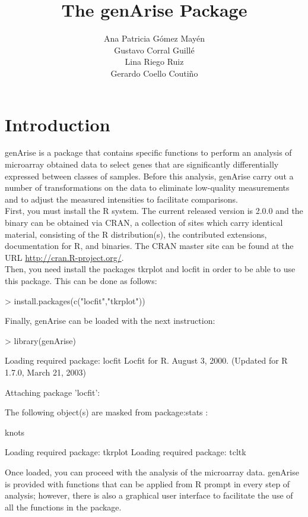 \documentclass[12pt]{article}
\title{The genArise Package}
\author{Ana Patricia G\'omez May\'en\\ Gustavo Corral Guill\'e\\ Lina Riego Ruiz\\ Gerardo Coello Couti\~no}
\begin{document}
\maketitle

\section{Introduction}

genArise is a package that contains specific functions to perform an analysis of microarray obtained data to select genes that are significantly differentially expressed between classes of samples. Before this analysis, genArise carry out a number of transformations on the data to eliminate low-quality measurements and to adjust the measured intensities to facilitate comparisons.\\

First, you must install the R system. The current released version is 2.0.0 and the binary can be obtained via CRAN, a collection of sites which carry identical material, consisting of the R distribution(s), the contributed extensions, documentation for R, and binaries. The CRAN master site can be found at the URL \url{http://cran.R-project.org/}. \\

Then, you need install the packages tkrplot and locfit in order to be able to use this package. This can be done as follows:
\begin{Scode}
> install.packages(c("locfit","tkrplot"))
\end{Scode}

Finally, genArise can be loaded with the next instruction:\\
\begin{Schunk}
\begin{Sinput}
> library(genArise)
\end{Sinput}
\begin{Soutput}
Loading required package: locfit 
Locfit for R.
August 3, 2000.  (Updated for R 1.7.0, March 21, 2003)

Attaching package 'locfit':


	The following object(s) are masked from package:stats :

	 knots 

Loading required package: tkrplot 
Loading required package: tcltk 
\end{Soutput}
\end{Schunk}
Once loaded, you can proceed with the analysis of the microarray data. genArise is provided with functions that can be applied from R prompt in every step of analysis; however, there is also a graphical user interface to facilitate the use of all the functions in the package.
\end{document}
